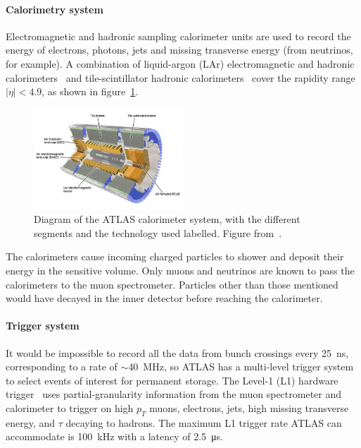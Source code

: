 \paragraph*{Calorimetry system} \hfill \break
Electromagnetic and hadronic sampling calorimeter units are used to record the energy of electrons, photons, jets and missing transverse energy (from neutrinos, for example). A combination of liquid-argon (LAr) electromagnetic and hadronic calorimeters~\cite{atlas_lar_cal_tdr} and tile-scintillator hadronic calorimeters~\cite{atlas_tile_cal_tdr} cover the rapidity range $|\eta| < 4.9$, as shown in figure~\ref{fig:atlas_calorimeter}.

\begin{figure}
    \centering
    \includegraphics[width = 0.5\textwidth]{figures/atlas_calorimeter.png}
    \caption{Diagram of the ATLAS calorimeter system, with the different segments and the technology used labelled. Figure from~\cite{collaboration_atlas_2008}.}
    \label{fig:atlas_calorimeter}
\end{figure}

The calorimeters cause incoming charged particles to shower and deposit their energy in the sensitive volume. Only muons and neutrinos are known to pass the calorimeters to the muon spectrometer.  Particles other than those mentioned would have decayed in the inner detector before reaching the calorimeter. 

\paragraph*{Trigger system} \hfill \break
It would be impossible to record all the data from bunch crossings every \SI{25}{\nano\second}, corresponding to a rate of $\sim$\SI{40}{MHz}, so ATLAS has a multi-level trigger system to select events of interest for permanent storage. The Level-1 (L1) hardware trigger~\cite{atlas_l1_trigger_tdr} uses partial-granularity information from the muon spectrometer and calorimeter to trigger on high $p_T$ muons, electrons, jets, high missing transverse energy, and $\tau$ decaying to hadrons. The maximum L1 trigger rate ATLAS can accommodate is \SI{100}{kHz} with a latency of \SI{2.5}{\micro\second}. 


